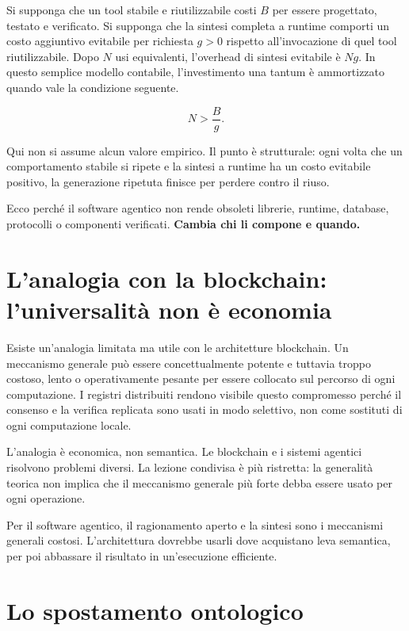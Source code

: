 \documentclass[10pt,oneside,openany]{book}
\begin{document}
Si supponga che un tool stabile e riutilizzabile costi $B$ per essere progettato, testato e verificato. Si supponga che la sintesi completa a runtime comporti un costo aggiuntivo evitabile per richiesta $g>0$ rispetto all'invocazione di quel tool riutilizzabile. Dopo $N$ usi equivalenti, l'overhead di sintesi evitabile è $Ng$. In questo semplice modello contabile, l'investimento una tantum è ammortizzato quando vale la condizione seguente.
\begin{formulabox}
\[
N > \frac{B}{g}.
\]
\end{formulabox}
Qui non si assume alcun valore empirico. Il punto è strutturale: ogni volta che un comportamento stabile si ripete e la sintesi a runtime ha un costo evitabile positivo, la generazione ripetuta finisce per perdere contro il riuso.

Ecco perché il software agentico non rende obsoleti librerie, runtime, database, protocolli o componenti verificati. \textbf{Cambia chi li compone e quando.}

\section{L'analogia con la blockchain: l'universalità non è economia}

Esiste un'analogia limitata ma utile con le architetture blockchain. Un meccanismo generale può essere concettualmente potente e tuttavia troppo costoso, lento o operativamente pesante per essere collocato sul percorso di ogni computazione. I registri distribuiti rendono visibile questo compromesso perché il consenso e la verifica replicata sono usati in modo selettivo, non come sostituti di ogni computazione locale.

L'analogia è economica, non semantica. Le blockchain e i sistemi agentici risolvono problemi diversi. La lezione condivisa è più ristretta: la generalità teorica non implica che il meccanismo generale più forte debba essere usato per ogni operazione.

Per il software agentico, il ragionamento aperto e la sintesi sono i meccanismi generali costosi. L'architettura dovrebbe usarli dove acquistano leva semantica, per poi abbassare il risultato in un'esecuzione efficiente.

\section{Lo spostamento ontologico}
\end{document}
